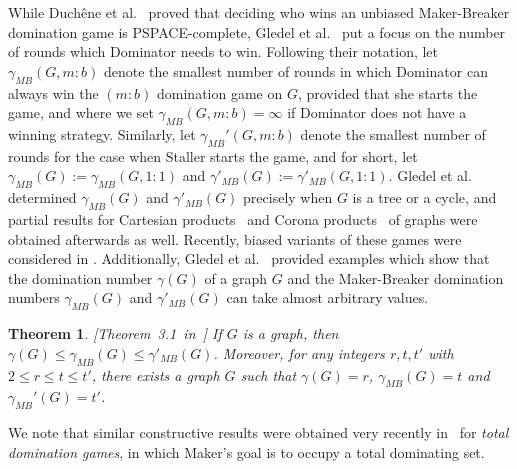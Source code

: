 \documentclass[reqno, 12pt]{amsart}
\numberwithin{equation}{section}
\numberwithin{figure}{section}
\newtheorem{theorem}{Theorem}
\begin{document}
While Duch\^ene et al.~\cite{duchene2020maker} proved that deciding who wins an unbiased Maker-Breaker domination game
is PSPACE-complete,
Gledel et al.~\cite{gledel2019maker} put a focus on the number of rounds
which Dominator needs to win. Following their
notation, let $\gamma_{MB}(G,m:b)$ denote the smallest number of rounds in which Dominator can always win the $(m:b)$ domination game on $G$, provided that she starts the game, 
and where we set $\gamma_{MB}(G,m:b)=\infty$ if Dominator does not have a winning strategy. Similarly, let
$\gamma_{MB}'(G,m:b)$ denote the smallest number of rounds 
for the case when Staller starts the game,
and for short, let
$\gamma_{MB}(G) := \gamma_{MB}(G,1:1)$ and
$\gamma'_{MB}(G) := \gamma'_{MB}(G,1:1)$.
Gledel et al.~\cite{gledel2019maker} determined
$\gamma_{MB}(G)$ and $\gamma'_{MB}(G)$
precisely when $G$ is a tree or a cycle,
and partial results for 
Cartesian products~\cite{dokyeesun2023maker,forcan2020maker}
and Corona products~\cite{divakaran2024maker}
of graphs
were obtained afterwards as well.
Recently, biased variants of these games were considered in \cite{bagdas2024biased,brevsar2025thresholds}.
Additionally, Gledel et al.~\cite{gledel2019maker}
provided examples which show that the domination number $\gamma(G)$ of a graph $G$
and the Maker-Breaker domination numbers
$\gamma_{MB}(G)$ and $\gamma'_{MB}(G)$ can take almost arbitrary values.

\begin{theorem}\label{thm:gledel.construction}[Theorem~3.1~in~\cite{gledel2019maker}]
If $G$ is a graph, then $\gamma(G)\leq \gamma_{MB}(G)\leq \gamma'_{MB}(G)$. Moreover, for any integers $r,t,t'$ with
$2\leq r\leq t\leq t'$, there exists a graph $G$ such that $\gamma(G)=r$, $\gamma_{MB}(G)=t$ and
$\gamma_{MB}'(G)=t'$.
\end{theorem}

We note that similar constructive results were obtained very recently in~\cite{divakaran2025maker} for \textit{total domination games}, in which Maker's goal is to occupy a total dominating set.

\smallskip
\end{document}
